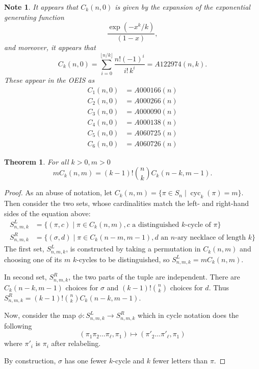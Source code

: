 \documentclass{article}
\newtheorem{theorem}[theo]{Theorem}
\newtheorem{note}[theo]{Note}
\begin{document}
  \begin{note}
    \label{basecase}
    It appears that $C_k(n,0)$ is given by the expansion of the exponential 
    generating function \begin{equation}
      \frac{\exp(-x^k/k)}{(1-x)},
    \end{equation} and moreover, it appears that \begin{equation}
      C_k(n,0) = \sum_{i=0}^{\lfloor n/k \rfloor} \frac{n! (-1)^i}{i!\,k^i} = A122974(n,k).
    \end{equation} These appear in the OEIS as
    \begin{align}
      C_1(n,0) &= A000166(n) \\
      C_2(n,0) &= A000266(n) \\
      C_3(n,0) &= A000090(n) \\
      C_4(n,0) &= A000138(n) \\
      C_5(n,0) &= A060725(n) \\
      C_6(n,0) &= A060726(n)
    \end{align}
  \end{note}
  \begin{theorem}
    \label{cycRecurrence}
    For all $k > 0, m > 0$ \begin{equation}
      mC_k(n, m) = (k-1)!\binom{n}{k}C_k(n-k, m-1).
    \end{equation}
  \end{theorem}
  \begin{proof}
    As an abuse of notation, let $C_k(n, m) = \{ \pi \in S_n \mid \operatorname{cyc}_k(\pi) = m\}$.
    Then consider the two sets, whose cardinalities match the left- and
    right-hand sides of the equation above:
    \begin{align}
      S^{L}_{n,m,k} &= \{ (\pi, c) \mid \pi \in C_k(n, m), c \text{ a distinguished } k\text{-cycle of } \pi \} \\
      S^{R}_{n,m,k} &= \{ (\sigma, d) \mid \pi \in C_k(n-m, m-1), d \text{ an } n\text{-ary necklace of length } k\}
    \end{align}
    The first set, $S^{L}_{n,m,k}$, is constructed by taking a permutation in
    $C_k(n,m)$ and choosing one of its $m$ $k$-cycles to be distinguished, so
    $S^{L}_{n,m,k} = mC_k(n,m)$.

    In second set, $S^{R}_{n,m,k}$, the two parts of the tuple are independent.
    There are $C_k(n-k, m-1)$ choices for $\sigma$ and $(k-1)!\binom{n}{k}$
    choices for $d$. Thus $S^{R}_{n,m,k} = (k-1)!\binom{n}{k}C_k(n-k, m-1)$.

    Now, consider the map $\phi \colon S^{L}_{n,m,k} \rightarrow S^{R}_{n,m,k}$
    which in cycle notation does the following \begin{equation}
      (\pi_1\pi_2 \dots \pi_\ell, \pi_1) \mapsto (\pi'_2 \dots \pi'_\ell, \pi_1)
    \end{equation} where $\pi'_i$ is $\pi_i$ after relabeling.

    By construction, $\sigma$ has one fewer $k$-cycle and $k$ fewer letters
    than $\pi$.
  \end{proof}
\end{document}
